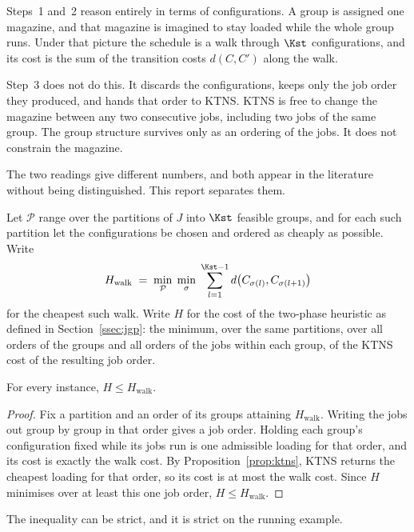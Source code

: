 Steps~1 and~2 reason entirely in terms of configurations. A group is assigned one
magazine, and that magazine is imagined to stay loaded while the whole group
runs. Under that picture the schedule is a walk through $\Kst$ configurations,
and its cost is the sum of the transition costs $d(C,C')$ along the walk.

Step~3 does not do this. It discards the configurations, keeps only the job
order they produced, and hands that order to KTNS. KTNS is free to change the
magazine between any two consecutive jobs, including two jobs of the same group.
The group structure survives only as an ordering of the jobs. It does not
constrain the magazine.

The two readings give different numbers, and both appear in the literature
without being distinguished. This report separates them.

\begin{definition}\label{def:frames}
Let $\mathcal{P}$ range over the partitions of $J$ into $\Kst$ feasible groups,
and for each such partition let the configurations be chosen and ordered as
cheaply as possible. Write
\[
  H_{\mathrm{walk}}
  \;=\;\min_{\mathcal{P}}\;\min_{\sigma}\;
        \sum_{l=1}^{\Kst - 1} d\bigl(C_{\sigma(l)}, C_{\sigma(l+1)}\bigr)
\]
for the cheapest such walk. Write $H$ for the cost of the two-phase heuristic as
defined in Section~\ref{ssec:jgp}: the minimum, over the same partitions, over
all orders of the groups and all orders of the jobs within each group, of the
KTNS cost of the resulting job order.
\end{definition}

\begin{proposition}\label{prop:frames}
For every instance, $H \le H_{\mathrm{walk}}$.
\end{proposition}

\begin{proof}
Fix a partition and an order of its groups attaining $H_{\mathrm{walk}}$. Writing
the jobs out group by group in that order gives a job order. Holding each
group's configuration fixed while its jobs run is one admissible loading for
that order, and its cost is exactly the walk cost. By
Proposition~\ref{prop:ktns}, KTNS returns the cheapest loading for that order,
so its cost is at most the walk cost. Since $H$ minimises over at least this
one job order, $H \le H_{\mathrm{walk}}$.
\end{proof}

The inequality can be strict, and it is strict on the running example.

